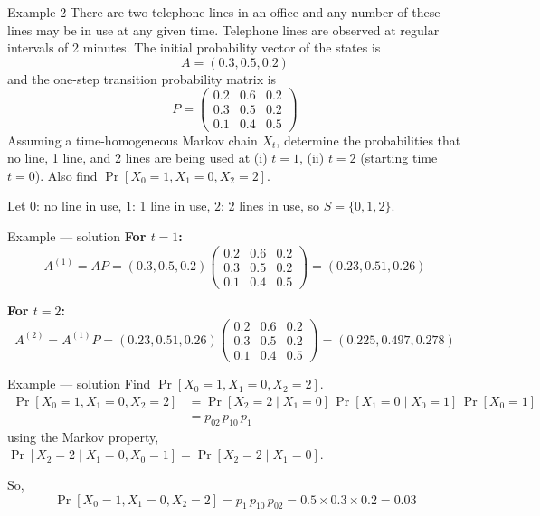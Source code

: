 \documentclass[aspectratio=169]{beamer}
\begin{document}
    \begin{frame}{Example 2}
        There are two telephone lines in an office and any number of these lines may be in use at any given time. Telephone lines are observed at regular intervals of 2 minutes. The initial probability vector of the states is
        \[
            A = (0.3, 0.5, 0.2)
        \]
        and the one-step transition probability matrix is
        \[
            P = \begin{pmatrix} 0.2 & 0.6 & 0.2 \\ 0.3 & 0.5 & 0.2 \\ 0.1 & 0.4 & 0.5 \end{pmatrix}
        \]
        Assuming a time-homogeneous Markov chain $X_t$, determine the probabilities that no line, 1 line, and 2 lines are being used at (i) $t=1$, (ii) $t=2$ (starting time $t=0$). Also find $\Pr[X_0 = 1, X_1 = 0, X_2 = 2]$.
 
        Let $0$: no line in use, $1$: 1 line in use, $2$: 2 lines in use, so $S = \{0, 1, 2\}$.
    \end{frame}
 
    \begin{frame}{Example --- solution}
        \textbf{For $t=1$:}
        \[
            A^{(1)} = AP = (0.3, 0.5, 0.2) \begin{pmatrix} 0.2 & 0.6 & 0.2 \\ 0.3 & 0.5 & 0.2 \\ 0.1 & 0.4 & 0.5 \end{pmatrix} = (0.23, 0.51, 0.26)
        \]
 
        \textbf{For $t=2$:}
        \[
            A^{(2)} = A^{(1)} P = (0.23, 0.51, 0.26) \begin{pmatrix} 0.2 & 0.6 & 0.2 \\ 0.3 & 0.5 & 0.2 \\ 0.1 & 0.4 & 0.5 \end{pmatrix} = (0.225, 0.497, 0.278)
        \]
    \end{frame}
 
 
    \begin{frame}{Example --- solution}
        Find $\Pr[X_0 = 1, X_1 = 0, X_2 = 2]$.
        \begin{align*}
            \Pr[X_0 = 1, X_1 = 0, X_2 = 2] &= \Pr[X_2 = 2 \mid X_1 = 0] \, \Pr[X_1 = 0 \mid X_0 = 1] \, \Pr[X_0 = 1] \\
            &= p_{02} \, p_{10} \, p_1
        \end{align*}
        using the Markov property, $\Pr[X_2 = 2 \mid X_1 = 0, X_0 = 1] = \Pr[X_2 = 2 \mid X_1 = 0]$.
 
        So,
        \[
            \Pr[X_0 = 1, X_1 = 0, X_2 = 2] = p_1 \, p_{10} \, p_{02} = 0.5 \times 0.3 \times 0.2 = 0.03
        \]
    \end{frame}
 
\end{document}
